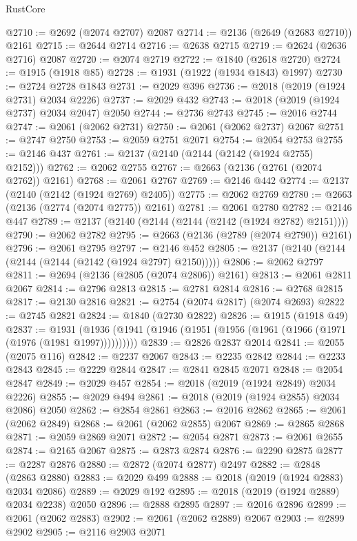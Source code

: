 \begin{lexlean}{RustCore}
\begin{coremodule}
@2710 := @2692 (@2074 @2707) @2087
@2714 := @2136 (@2649 (@2683 @2710)) @2161
@2715 := @2644 @2714
@2716 := @2638 @2715
@2719 := @2624 (@2636 @2716) @2087
@2720 := @2074 @2719
@2722 := @1840 (@2618 @2720)
@2724 := @1915 (@1918 @85)
@2728 := @1931 (@1922 (@1934 @1843) @1997)
@2730 := @2724 @2728 @1843
@2731 := @2029 @396
@2736 := @2018 (@2019 (@1924 @2731) @2034 @2226)
@2737 := @2029 @432
@2743 := @2018 (@2019 (@1924 @2737) @2034 @2047) @2050
@2744 := @2736 @2743
@2745 := @2016 @2744
@2747 := @2061 (@2062 @2731)
@2750 := @2061 (@2062 @2737) @2067
@2751 := @2747 @2750
@2753 := @2059 @2751 @2071
@2754 := @2054 @2753
@2755 := @2146 @437
@2761 := @2137 (@2140 (@2144 (@2142 (@1924 @2755) @2152)))
@2762 := @2062 @2755
@2767 := @2663 (@2136 (@2761 (@2074 @2762)) @2161)
@2768 := @2061 @2767
@2769 := @2146 @442
@2774 := @2137 (@2140 (@2142 (@1924 @2769) @2405))
@2775 := @2062 @2769
@2780 := @2663 (@2136 (@2774 (@2074 @2775)) @2161)
@2781 := @2061 @2780
@2782 := @2146 @447
@2789 := @2137 (@2140 (@2144 (@2144 (@2142 (@1924 @2782) @2151))))
@2790 := @2062 @2782
@2795 := @2663 (@2136 (@2789 (@2074 @2790)) @2161)
@2796 := @2061 @2795
@2797 := @2146 @452
@2805 := @2137 (@2140 (@2144 (@2144 (@2144 (@2142 (@1924 @2797) @2150)))))
@2806 := @2062 @2797
@2811 := @2694 (@2136 (@2805 (@2074 @2806)) @2161)
@2813 := @2061 @2811 @2067
@2814 := @2796 @2813
@2815 := @2781 @2814
@2816 := @2768 @2815
@2817 := @2130 @2816
@2821 := @2754 (@2074 @2817) (@2074 @2693)
@2822 := @2745 @2821
@2824 := @1840 (@2730 @2822)
@2826 := @1915 (@1918 @49)
@2837 := @1931 (@1936 (@1941 (@1946 (@1951 (@1956 (@1961 (@1966 (@1971 (@1976 (@1981 @1997))))))))))
@2839 := @2826 @2837 @2014
@2841 := @2055 (@2075 @116)
@2842 := @2237 @2067
@2843 := @2235 @2842
@2844 := @2233 @2843
@2845 := @2229 @2844
@2847 := @2841 @2845 @2071
@2848 := @2054 @2847
@2849 := @2029 @457
@2854 := @2018 (@2019 (@1924 @2849) @2034 @2226)
@2855 := @2029 @494
@2861 := @2018 (@2019 (@1924 @2855) @2034 @2086) @2050
@2862 := @2854 @2861
@2863 := @2016 @2862
@2865 := @2061 (@2062 @2849)
@2868 := @2061 (@2062 @2855) @2067
@2869 := @2865 @2868
@2871 := @2059 @2869 @2071
@2872 := @2054 @2871
@2873 := @2061 @2655
@2874 := @2165 @2067
@2875 := @2873 @2874
@2876 := @2290 @2875
@2877 := @2287 @2876
@2880 := @2872 (@2074 @2877) @2497
@2882 := @2848 (@2863 @2880)
@2883 := @2029 @499
@2888 := @2018 (@2019 (@1924 @2883) @2034 @2086)
@2889 := @2029 @192
@2895 := @2018 (@2019 (@1924 @2889) @2034 @2238) @2050
@2896 := @2888 @2895
@2897 := @2016 @2896
@2899 := @2061 (@2062 @2883)
@2902 := @2061 (@2062 @2889) @2067
@2903 := @2899 @2902
@2905 := @2116 @2903 @2071

\end{coremodule}
\end{lexlean}
